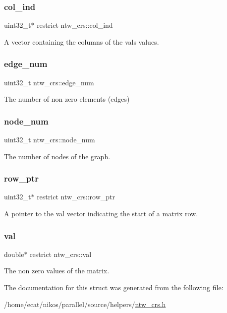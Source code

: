 \subsubsection{\texorpdfstring{col\+\_\+ind}{col\_ind}}
{\footnotesize\ttfamily uint32\+\_\+t$\ast$ restrict ntw\+\_\+crs\+::col\+\_\+ind}

A vector containing the columns of the val\textquotesingle{}s values. \mbox{\label{structntw__crs_a85160ebade6d93ba77c9e90f2f237cea}} 
\subsubsection{\texorpdfstring{edge\+\_\+num}{edge\_num}}
{\footnotesize\ttfamily uint32\+\_\+t ntw\+\_\+crs\+::edge\+\_\+num}

The number of non zero elements (edges) \mbox{\label{structntw__crs_a36a11fbae59bf6159e40cb18e5f37ada}} 
\subsubsection{\texorpdfstring{node\+\_\+num}{node\_num}}
{\footnotesize\ttfamily uint32\+\_\+t ntw\+\_\+crs\+::node\+\_\+num}

The number of nodes of the graph. \mbox{\label{structntw__crs_abf117885ca226f2a82ff28dca7177c34}} 
\subsubsection{\texorpdfstring{row\+\_\+ptr}{row\_ptr}}
{\footnotesize\ttfamily uint32\+\_\+t$\ast$ restrict ntw\+\_\+crs\+::row\+\_\+ptr}

A pointer to the val vector indicating the start of a matrix\textquotesingle{} row. \mbox{\label{structntw__crs_a5ed2cc918a69051b395e9b151a66867f}} 
\subsubsection{\texorpdfstring{val}{val}}
{\footnotesize\ttfamily double$\ast$ restrict ntw\+\_\+crs\+::val}

The non zero values of the matrix. 

The documentation for this struct was generated from the following file\+:\begin{DoxyCompactItemize}
\item 
/home/ecat/nikos/parallel/source/helpers/\mbox{\hyperlink{ntw__crs_8h}{ntw\+\_\+crs.\+h}}\end{DoxyCompactItemize}
